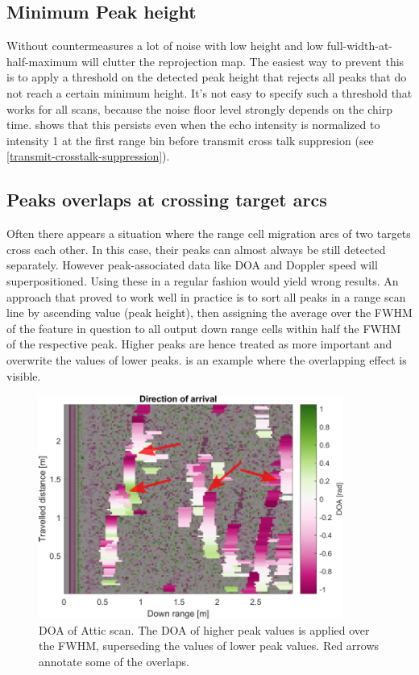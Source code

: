 \subsection{Minimum Peak height}\label{minimum-peak-height}
Without countermeasures a lot of noise with low height and low full-width-at-half-maximum will clutter the reprojection map. The easiest way to prevent this is to apply a threshold on the detected peak height that rejects all peaks that do not reach a certain minimum height. It's not easy to specify such a threshold that works for all scans, because the noise floor level strongly depends on the chirp time.  shows that this persists even when the echo intensity is normalized to intensity 1 at the first range bin before transmit cross talk suppresion (see \cref{transmit-crosstalk-suppression}).

\subsection{Peaks overlaps at crossing target arcs} \label{peaks-overlaps-at-crossing-target-arcs}
Often there appears a situation where the range cell migration arcs of two targets cross each other. In this case, their peaks can almost always be still detected separately. However peak-associated data like DOA and Doppler speed will superpositioned. Using these in a regular fashion would yield wrong results. An approach that proved to work well in practice is to sort all peaks in a range scan line by ascending value (peak height), then assigning the average over the FWHM of the feature in question to all output down range cells within half the FWHM of the respective peak. Higher peaks are hence treated as more important and overwrite the values of lower peaks.  is an example where the overlapping effect is visible.

\begin{figure}[htbp]
    \centering
    \includegraphics[max width=10cm]{gfx/figures/attic_doa_annot.pdf}
    \caption{DOA of Attic scan. The DOA of higher peak values is applied over the FWHM, superseding the values of lower peak values. Red arrows annotate some of the overlaps.}
    \label{fig:overlap}
\end{figure}

